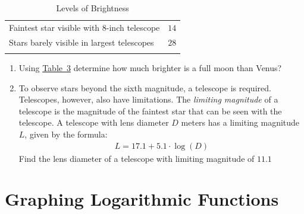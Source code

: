 \documentclass[10pt,]{book}
\theoremstyle{plain}
\theoremstyle{definition}
\theoremstyle{definition}
\theoremstyle{definition}
\numberwithin{equation}{section}
\newcommand{\hrulethick} {\noalign{\hrule height 0.11em}}
\begin{document}
\begin{exerciselist}
\begin{table}
\begin{tabular}{cc}
\multicolumn{1}{l}{Faintest star visible with \(8\)-inch telescope}&\(14\)\tabularnewline[0pt]
\multicolumn{1}{l}{Stars barely visible in largest telescopes}&\(28\)\tabularnewline\hrulethick
\end{tabular}
\caption{Levels of Brightness\label{star-chart}}
\end{table}
\hypertarget{p-322}{}%
\leavevmode%
\begin{enumerate}[label=(\alph*)]
\item\hypertarget{li-235}{}Using \hyperref[star-chart]{Table~3} determine how much brighter is a full moon than Venus?%
\item\hypertarget{li-236}{}To observe stars beyond the sixth magnitude, a telescope is required.  Telescopes, however, also have limitations.  The \emph{limiting magnitude} of a telescope is the magnitude of the faintest star that can be seen with the telescope.  A telescope with lens diameter \(D\) meters has a limiting magnitude \(L\), given by the formula:%
\begin{gather*}
L = 17.1 + 5.1 \cdot \log (D)
\end{gather*}
Find the lens diameter of a telescope with limiting magnitude of \(11.1\)%
\end{enumerate}
%
\par\smallskip
\end{exerciselist}
\typeout{************************************************}
\typeout{************************************************}
\section[{Graphing Logarithmic Functions}]{Graphing Logarithmic Functions}\label{chapter05-section03}
\typeout{************************************************}
\typeout{************************************************}
\end{document}
